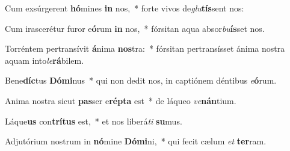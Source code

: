\item Cum exsúrgerent \textbf{hó}mines \textbf{in} nos,~* forte vivos de\textit{glu}\textbf{tís}sent nos:
\item Cum irascerétur furor e\textbf{ó}rum \textbf{in} nos,~* fórsitan aqua absor\textit{bu}\textbf{ís}set nos.
\item Torréntem pertransívit \textbf{á}nima \textbf{nos}tra:~* fórsitan pertransísset ánima nostra aquam into\textit{le}\textbf{rá}bilem.
\item Bene\textbf{díc}tus \textbf{Dó}\textbf{mi}nus~* qui non dedit nos, in captiónem déntibus \textit{e}\textbf{ó}rum.
\item Anima nostra sicut \textbf{pas}ser e\textbf{rép}\textbf{ta} est~* de láqueo \textit{ve}\textbf{nán}tium.
\item Láque\textbf{us} con\textbf{trí}\textbf{tus} est,~* et nos liberá\textit{ti} \textbf{su}mus.
\item Adjutórium nostrum in \textbf{nó}mine \textbf{Dó}\textbf{mi}ni,~* qui fecit cælum \textit{et} \textbf{ter}ram.
